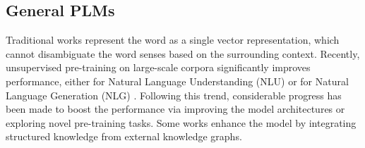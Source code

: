 \documentclass[11pt]{article}
\begin{document}
\begin{table}[t]
    \centering
    \caption{Hyperparameters for fine-tuning on science- and finance-domain downstream tasks. 
    The maximum sequence length is set to 64 for OIR, and is set to 128 for other tasks.
    The batch size is set to 128 for OIR, and is set to 32 for other tasks.
    }
    \label{tab:app_params_fine}
\end{table}



\subsection{General PLMs}
Traditional works \cite{DBLP:conf/nips/MikolovSCCD13,DBLP:conf/emnlp/PenningtonSM14}
represent the word as a single vector representation, which cannot disambiguate the word senses based on the surrounding context.
Recently, unsupervised pre-training on large-scale corpora significantly improves performance, either for Natural Language Understanding (NLU) \cite{DBLP:conf/naacl/PetersNIGCLZ18,DBLP:conf/naacl/DevlinCLT19,DBLP:journals/taslp/CuiCLQY21} or for Natural Language Generation (NLG) \cite{DBLP:journals/jmlr/RaffelSRLNMZLL20,DBLP:conf/nips/BrownMRSKDNSSAA20,DBLP:conf/acl/LewisLGGMLSZ20}. 
Following this trend, considerable progress \cite{DBLP:journals/corr/abs-1907-11692,DBLP:conf/nips/YangDYCSL19,DBLP:conf/iclr/ClarkLLM20,DBLP:journals/tacl/JoshiCLWZL20,DBLP:conf/iclr/0225BYWXBPS20,DBLP:conf/emnlp/DiaoBSZW20} has been made to boost the performance via improving the model architectures or exploring novel pre-training tasks.
Some works \cite{DBLP:journals/corr/abs-1904-09223,DBLP:conf/acl/ZhangHLJSL19,DBLP:conf/acl/QinLT00JHS020} enhance the model by integrating structured knowledge from external knowledge graphs.
\end{document}
